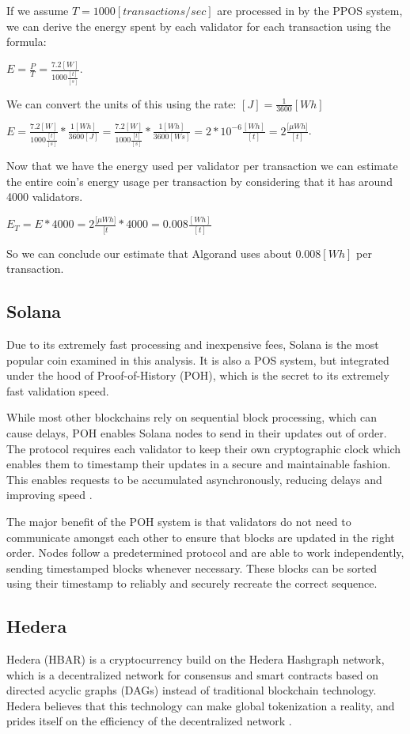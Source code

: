 \documentclass{article}
\begin{document}
If we assume $T = 1000[transactions/sec]$ are processed in by the PPOS system, we can derive the energy spent by each validator for each transaction using the formula:

$E = \frac{P}{T} = \frac{7.2[W]}{1000\frac{[t]}{[s]}}$.

We can convert the units of this using the rate: $[J] = \frac{1}{3600}[Wh]$

$E = \frac{7.2[W]}{1000\frac{[t]}{[s]}} * \frac{1 [Wh]}{3600 [J]} = \frac{7.2[W]}{1000\frac{[t]}{[s]}} * \frac{1 [Wh]}{3600 [Ws]} = 2 * 10^{-6} \frac{[Wh]}{[t]} = 2 \frac{{[\mu}Wh]}{[t]}$.

Now that we have the energy used per validator per transaction we can estimate the entire coin's energy usage per transaction by considering that it has around 4000 validators.

$E_{T} = E * 4000 = 2 \frac{{[\mu}Wh]}{[t} * 4000 = 0.008 \frac{[Wh]}{[t]}$ \cite{algoestimate}

So we can conclude our estimate that Algorand uses about $0.008 [Wh]$ per transaction. 

\subsection{Solana}

Due to its extremely fast processing and inexpensive fees, Solana is the most popular coin examined in this analysis. It is also a POS system, but integrated under the hood of Proof-of-History (POH), which is the secret to its extremely fast validation speed.

While most other blockchains rely on sequential block processing, which can cause delays, POH enables Solana nodes to send in their updates out of order. The protocol requires each validator to keep their own cryptographic clock which enables them to timestamp their updates in a secure and maintainable fashion. This enables requests to be accumulated asynchronously, reducing delays and improving speed \cite{solanaworks}.

The major benefit of the POH system is that validators do not need to communicate amongst each other to ensure that blocks are updated in the right order. Nodes follow a predetermined protocol and are able to work independently, sending timestamped blocks whenever necessary. These blocks can be sorted using their timestamp to reliably and securely recreate the correct sequence. 

\subsection{Hedera}
Hedera (HBAR) is a cryptocurrency build on the Hedera Hashgraph network, which is a decentralized network for consensus and smart contracts based on directed acyclic graphs (DAGs) instead of traditional blockchain technology. Hedera believes that this technology can make global tokenization a reality, and prides itself on the efficiency of the decentralized network \cite{hbar}.
\end{document}
